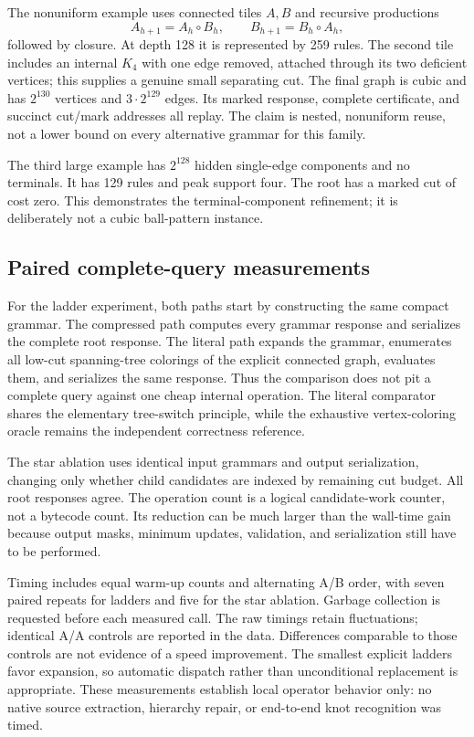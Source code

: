 \documentclass[11pt,a4paper]{article}
\theoremstyle{definition}
\theoremstyle{remark}
\begin{document}
The nonuniform example uses connected tiles $A,B$ and recursive productions
\[
 A_{h+1}=A_h\circ B_h,\qquad B_{h+1}=B_h\circ A_h,
\]
followed by closure. At depth 128 it is represented by 259 rules. The second tile includes an internal $K_4$ with one edge removed, attached through its two deficient vertices; this supplies a genuine small separating cut. The final graph is cubic and has $2^{130}$ vertices and $3\cdot2^{129}$ edges. Its marked response, complete certificate, and succinct cut/mark addresses all replay. The claim is nested, nonuniform reuse, not a lower bound on every alternative grammar for this family.

The third large example has $2^{128}$ hidden single-edge components and no terminals. It has 129 rules and peak support four. The root has a marked cut of cost zero. This demonstrates the terminal-component refinement; it is deliberately not a cubic ball-pattern instance.

\subsection{Paired complete-query measurements}


For the ladder experiment, both paths start by constructing the same compact grammar. The compressed path computes every grammar response and serializes the complete root response. The literal path expands the grammar, enumerates all low-cut spanning-tree colorings of the explicit connected graph, evaluates them, and serializes the same response. Thus the comparison does not pit a complete query against one cheap internal operation. The literal comparator shares the elementary tree-switch principle, while the exhaustive vertex-coloring oracle remains the independent correctness reference.

The star ablation uses identical input grammars and output serialization, changing only whether child candidates are indexed by remaining cut budget. All root responses agree. The operation count is a logical candidate-work counter, not a bytecode count. Its reduction can be much larger than the wall-time gain because output masks, minimum updates, validation, and serialization still have to be performed.

Timing includes equal warm-up counts and alternating A/B order, with seven paired repeats for ladders and five for the star ablation. Garbage collection is requested before each measured call. The raw timings retain fluctuations; identical A/A controls are reported in the data. Differences comparable to those controls are not evidence of a speed improvement. The smallest explicit ladders favor expansion, so automatic dispatch rather than unconditional replacement is appropriate. These measurements establish local operator behavior only: no native source extraction, hierarchy repair, or end-to-end knot recognition was timed.
\end{document}

